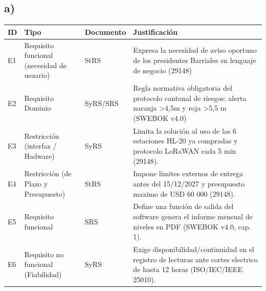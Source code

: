 \documentclass[11pt,a4paper]{article}
\begin{document}
	\subsection*{a)}
	
	\begin{center}
		\begin{tabularx}{\textwidth}{|l|p{3.2cm}|l|X|}
			\hline
			\textbf{ID} & \textbf{Tipo} & \textbf{Documento} & \textbf{Justificación} \\
			\hline
			E1 & Requisito funcional (necesidad de usuario) & StRS & Expresa la necesidad de aviso oportuno de los presidentes Barriales en lenguaje de negocio (29148) \\
			\hline
			E2 & Requisito Dominio & SyRS/SRS & Regla normativa obligatoria del protocolo cantonal de riesgos: alerta naranja >4,5m y roja >5,5 m (SWEBOK v4.0) \\
			\hline
			E3 & Restricción (interfaz / Hadware) & SyRS & Limita la solución al uso de las 6 estaciones HL-20 ya compradas y protocolo LoRaWAN cada 5 min (29148). \\
			\hline
			E4 & Restricción (de Plazo y Presupuesto) & StRS & Impone limites externos de entrega antes del 15/12/2027 y presupuesto maximo de USD 60 000 (29148). \\
			\hline
			E5 & Requisito funcional & SRS & Define una función de salida del software genera el informe mensual de niveles en PDF (SWEBOK v4.0, cap. 1). \\
			\hline
			E6 & Requisito no funcional (Fiabilidad) & SyRS & Exige disponibilidad/continuidad en el registro de lecturas ante cortes electrico de hasta 12 horas (ISO/IEC/IEEE 25010). \\
			\hline
		\end{tabularx}
	\end{center}
	
\end{document}
